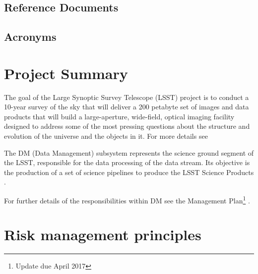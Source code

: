 \documentclass[DM,lsstdraft,PL]{lsstdoc}
\begin{document}
\subsection{Reference Documents\label{sect:references}}

\renewcommand{\refname}{}



\newpage
\subsection{Acronyms}

\newpage

\section{Project Summary \label{sect:project}}

The goal of the Large Synoptic Survey Telescope (LSST) project is to conduct a 10-year survey of the sky that will deliver a 200 petabyte set of images and data products that will build a large-aperture, wide-field, optical imaging facility designed to address some of the most pressing questions about the structure and evolution of the universe and the objects in it.  For more details see 

The DM (Data Management) subsystem represents the science ground segment of the LSST, responsible for the data processing of the data stream. Its objective is the production of a set of science pipelines to produce the LSST Science Products .

For further details of the responsibilities within DM see the Management Plan\footnote{Update due April 2017} .


\newpage

\section{Risk management principles \label{sect:principles}}
\end{document}
